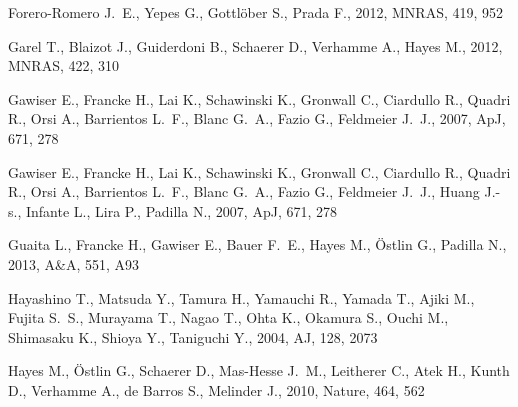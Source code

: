 \documentclass[usenatbib]{mn2e}
\newcommand{\apj}{ApJ}
\newcommand{\aj}{AJ}
\newcommand{\mnras}{MNRAS}
\newcommand{\aap}{A\&A}
\newcommand{\nat}{Nature}
\begin{document}
\begin{thebibliography}{}
{Forero-Romero} J.~E.,  {Yepes} G.,  {Gottl{\"o}ber} S.,    {Prada} F.,  2012,
  \mnras, 419, 952

{Garel} T.,  {Blaizot} J.,  {Guiderdoni} B.,  {Schaerer} D.,  {Verhamme} A.,
  {Hayes} M.,  2012, \mnras, 422, 310

{Gawiser} E.,  {Francke} H.,  {Lai} K.,  {Schawinski} K.,  {Gronwall} C.,
  {Ciardullo} R.,  {Quadri} R.,  {Orsi} A.,  {Barrientos} L.~F.,  {Blanc}
  G.~A.,  {Fazio} G.,    {Feldmeier} J.~J.,  2007, \apj, 671, 278

{Gawiser} E.,  {Francke} H.,  {Lai} K.,  {Schawinski} K.,  {Gronwall} C.,
  {Ciardullo} R.,  {Quadri} R.,  {Orsi} A.,  {Barrientos} L.~F.,  {Blanc}
  G.~A.,  {Fazio} G.,  {Feldmeier} J.~J.,  {Huang} J.-s.,  {Infante} L.,
  {Lira} P.,    {Padilla} N.,  2007, \apj, 671, 278

{Guaita} L.,  {Francke} H.,  {Gawiser} E.,  {Bauer} F.~E.,  {Hayes} M.,
  {{\"O}stlin} G.,    {Padilla} N.,  2013, \aap, 551, A93

{Hayashino} T.,  {Matsuda} Y.,  {Tamura} H.,  {Yamauchi} R.,  {Yamada} T.,
  {Ajiki} M.,  {Fujita} S.~S.,  {Murayama} T.,  {Nagao} T.,  {Ohta} K.,
  {Okamura} S.,  {Ouchi} M.,  {Shimasaku} K.,  {Shioya} Y.,    {Taniguchi} Y.,
  2004, \aj, 128, 2073

{Hayes} M.,  {{\"O}stlin} G.,  {Schaerer} D.,  {Mas-Hesse} J.~M.,  {Leitherer}
  C.,  {Atek} H.,  {Kunth} D.,  {Verhamme} A.,  {de Barros} S.,    {Melinder}
  J.,  2010, \nat, 464, 562


\end{thebibliography}
\end{document}
